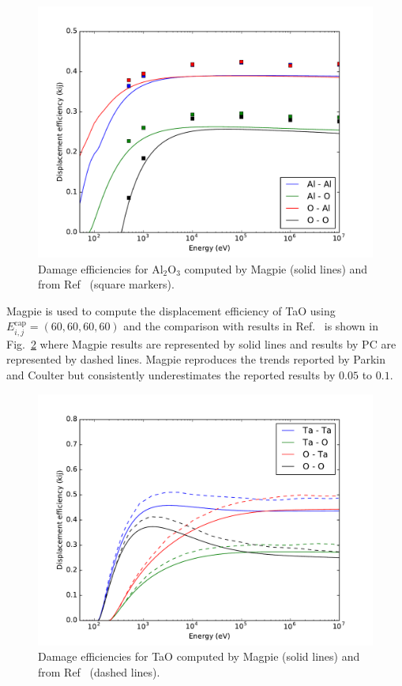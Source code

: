 \documentclass[review]{elsarticle}
\begin{document}
\begin{figure}[p]
	\centering
	\includegraphics[width=1\linewidth]{comparison_parkin_coulter_Al2O3/comparison_PC_1981_Magpie_Al2O3.pdf}
	\caption{Damage efficiencies for $\text{Al}_2\text{O}_3$ computed by Magpie (solid lines) and from Ref~\cite{PC1981} (square markers).}
	\label{fig:kij_Al2O3}
\end{figure}

Magpie is used to compute the displacement efficiency of TaO using $E_{i,j}^{\text{cap}}=(60,60,60,60)$ and the comparison with results in Ref.~\cite{PC1981} is shown in Fig.~\ref{fig:kij_TaO} where Magpie results are represented by solid lines and results by PC are represented by dashed lines. Magpie reproduces the trends reported by Parkin and Coulter but consistently underestimates the reported results by $0.05$ to $0.1$.
\begin{figure}[p]
	\centering
	\includegraphics[width=1\linewidth]{comparison_parkin_coulter_TaO/comparison_PC_1981_Magpie_TaO.pdf}
	\caption{Damage efficiencies for TaO computed by Magpie (solid lines) and from Ref~\cite{PC1981} (dashed lines).}
	\label{fig:kij_TaO}
\end{figure}
\end{document}
